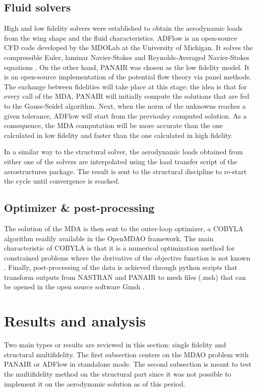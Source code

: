 \subsection{Fluid solvers}
High and low fidelity solvers were established to obtain the aerodynamic loads from the wing shape and the fluid characteristics. ADFlow is an open-source CFD code developed by the MDOLab at the University of Michigan. It solves the compressible Euler, laminar Navier-Stokes and Reynolds-Averaged Navier-Stokes equations \cite{lyu2013automatic}. On the other hand, PANAIR \cite{carmichael1981pan} was chosen as the low fidelity model. It is an open-source implementation of the potential flow theory via panel methods. The exchange between fidelities will take place at this stage: the idea is that for every call of the MDA, PANAIR will initially compute the solutions that are fed to the Gauss-Seidel algorithm. Next, when the norm of the unknowns reaches a given tolerance, ADFlow will start from the previoulsy computed solution. As a consequence, the MDA computation will be more accurate than the one calculated in low fidelity and faster than the one calculated in high fidelity. \par 
In a similar way to the structural solver, the aerodynamic loads obtained from either one of the solvers are interpolated using the load transfer script of the aerostructures package. The result is sent to the structural discipline to re-start the cycle until convergence is reached. 
\subsection{Optimizer \& post-processing}
The solution of the MDA is then sent to the outer-loop optimizer, a COBYLA algorithm readily available in the OpenMDAO framework.  The main characteristic of COBYLA is that it is a numerical optimization method for constrained problems where the derivative of the objective function is not known \cite{powell1994direct}. Finally, post-processing of the data is achieved through python scripts that transform outputs from NASTRAN and PANAIR to mesh files (.msh) that can be opened in the open source software Gmsh \cite{geuzaine2009gmsh}. 

\section{Results and analysis}
\label{sec:results}
Two main types or results are reviewed in this section: single fidelity and structural multifidelity. The first subsection centers on the MDAO problem with PANAIR or ADFlow in standalone mode. The second subsection is meant to test the multifidelity method on the structural part since it was not possible to implement it on the aerodynamic solution as of this period. 
